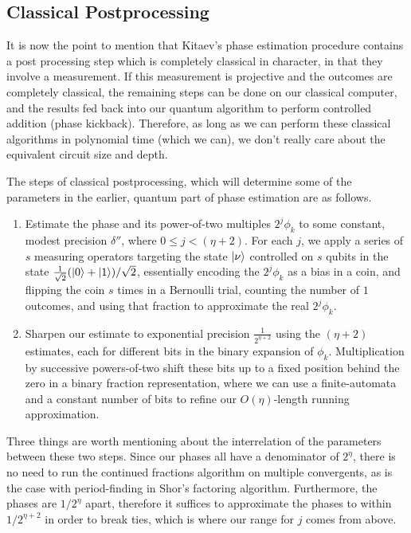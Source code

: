 \subsection{Classical Postprocessing}
\label{subsec:ksv-classical}

It is now the point to mention that Kitaev's phase estimation procedure
contains a post processing step which is completely classical in
character, in that they involve a measurement. If this measurement is
projective and the outcomes are completely classical, the remaining steps
can be done on our classical computer,
and the results fed back into our quantum algorithm to perform controlled
addition (phase kickback). Therefore, as long as we can perform these classical
algorithms in polynomial time (which we can), we don't really care
about the equivalent circuit size and depth.

The steps of classical postprocessing, which will determine some of the
parameters in the earlier, quantum part of phase estimation are as follows.

\begin{enumerate}

\item
Estimate the phase and its power-of-two multiples
$2^j \phi_k$ to
some constant, modest precision $\delta''$, where
$0 \le j < ({\eta}+2)$. For each $j$, we
apply a series of $s$ measuring operators targeting the state $\left\vert{\nu}\right\rangle$
controlled on $s$ qubits in the state $\frac{1}{\sqrt{2}}(\left\vert{0}\right\rangle+\left\vert{1}\right\rangle)/\sqrt{2}$,
essentially encoding the $2^j \phi_k$ as a bias in a coin, and flipping the
coin $s$ times in a Bernoulli trial, counting the number of $1$ outcomes,
and using that fraction to approximate the real $2^j \phi_k$.
\item
Sharpen our estimate to exponential precision $\frac{1}{2^{{\eta}+2}}$ using the
$({\eta}+2)$ estimates, each for different bits in the binary expansion of
$\phi_k$. Multiplication by successive powers-of-two shift these bits
up to a fixed position behind the zero in a binary fraction representation,
where we can use a finite-automata and a constant number of
bits to refine our $O({\eta})$-length running approximation.
\end{enumerate}

Three things are worth mentioning about the interrelation of the parameters
between these two steps. Since our phases all have a denominator of $2^{\eta}$,
there is no need to run the continued fractions algorithm on multiple
convergents, as is the case with period-finding in Shor's factoring algorithm.
Furthermore, the phases are $1/2^{\eta}$ apart, therefore it suffices to approximate
the phases to within $1/2^{{\eta}+2}$ in order to break ties, which is where
our range for $j$ comes from above.

